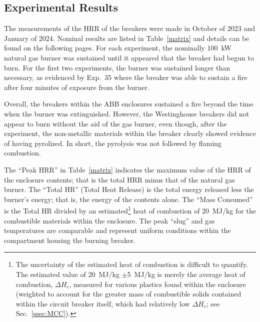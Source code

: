 \subsection{Experimental Results}
\label{sec:results}

The measurements of the HRR of the breakers were made in October of 2023 and January of 2024. Nominal results are listed in Table~\ref{matrix} and details can be found on the following pages. For each experiment, the nominally 100~kW natural gas burner was sustained until it appeared that the breaker had begun to burn. For the first two experiments, the burner was sustained longer than necessary, as evidenced by Exp.~35 where the breaker was able to sustain a fire after four minutes of exposure from the burner.

Overall, the breakers within the ABB enclosures sustained a fire beyond the time when the burner was extinguished. However, the Westinghouse breakers did not appear to burn without the aid of the gas burner, even though, after the experiment, the non-metallic materials within the breaker clearly showed evidence of having pyrolized. In short, the pyrolysis was not followed by flaming combustion.

The ``Peak HRR'' in Table~\ref{matrix} indicates the maximum value of the HRR of the enclosure contents; that is the total HRR minus that of the natural gas burner. The ``Total HR'' (Total Heat Release) is the total energy released less the burner's energy; that is, the energy of the contents alone. The ``Mass Consumed'' is the Total HR divided by an estimated\footnote{The uncertainty of the estimated heat of combustion is difficult to quantify. The estimated value of 20~MJ/kg $\pm$5~MJ/kg is merely the average heat of combustion, $\Delta H_c$, measured for various plastics found within the enclosure (weighted to account for the greater mass of combustible solids contained within the circuit breaker itself, which had relatively low $\Delta H_c$; see Sec.~\ref{ssec:MCC}).} heat of combustion of 20~MJ/kg for the combustible materials within the enclosure. The peak ``slug'' and gas temperatures are comparable and represent uniform conditions within the compartment housing the burning breaker.


